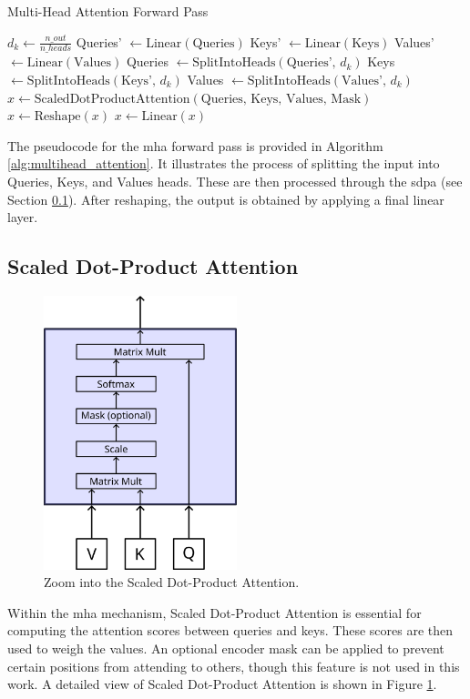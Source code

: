 \begin{algorithm}[H]
\caption{Multi-Head Attention Forward Pass}
\label{alg:multihead_attention}
$d_k \gets \frac{n\_out}{n\_heads}$\;
Queries' $\gets \text{Linear}(\text{Queries})$\;
Keys' $\gets \text{Linear}(\text{Keys})$\;
Values' $\gets \text{Linear}(\text{Values})$\;
Queries $\gets \text{SplitIntoHeads}(\text{Queries', }d_k)$\;
Keys $\gets \text{SplitIntoHeads}(\text{Keys', }d_k)$\;
Values $\gets \text{SplitIntoHeads}(\text{Values', }d_k)$\;
$x \gets \text{ScaledDotProductAttention}(\text{Queries, Keys, Values, Mask})$\;
$x \gets \text{Reshape}(x)$\;
$x \gets \text{Linear}(x)$\;
\end{algorithm}

The pseudocode for the \gls{mha} forward pass is provided in Algorithm \ref{alg:multihead_attention}. It illustrates the process of splitting the input into Queries, Keys, and Values heads. These are then processed through the \gls{sdpa} (see Section \ref{sec:sdpa}). After reshaping, the output is obtained by applying a final linear layer.


\subsection{Scaled Dot-Product Attention}
\label{sec:sdpa}

\begin{figure}[t]
    \centering
    \includegraphics[width=0.5\textwidth]{contents/Basics/scaled_dot_product.png}
    \caption{Zoom into the Scaled Dot-Product Attention.}
    \label{fig:scaled_dot_product}
\end{figure}
Within the \gls{mha} mechanism, Scaled Dot-Product Attention is essential for computing the attention scores between queries and keys. These scores are then used to weigh the values. An optional encoder mask can be applied to prevent certain positions from attending to others, though this feature is not used in this work. A detailed view of Scaled Dot-Product Attention is shown in Figure \ref{fig:scaled_dot_product}.

